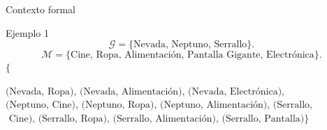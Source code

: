 \documentclass{beamer}
\newcommand{\M}{\mathcal{M}}
\newcommand{\G}{\mathcal{G}}
\begin{document}
\begin{frame}{Contexto formal}
    
        \begin{table}[H]
        \end{table}
        \begin{block}{Ejemplo 1}
         $$\G=\{\text{Nevada, Neptuno, Serrallo}\}.$$
         $$\M=\{\text{Cine, Ropa, Alimentación, Pantalla Gigante, Electrónica}\}.$$
         $\{$\begin{small}$\text{(Nevada, Ropa), (Nevada, Alimentación), (Nevada, Electrónica),}$\linebreak $\text{(Neptuno, Cine), (Neptuno, Ropa), (Neptuno, Alimentación), (Serrallo, }$ \linebreak $\text{ Cine), (Serrallo, Ropa), (Serrallo, Alimentación), (Serrallo, Pantalla)}\}$\end{small}
        \end{block}

\end{frame}
\end{document}
